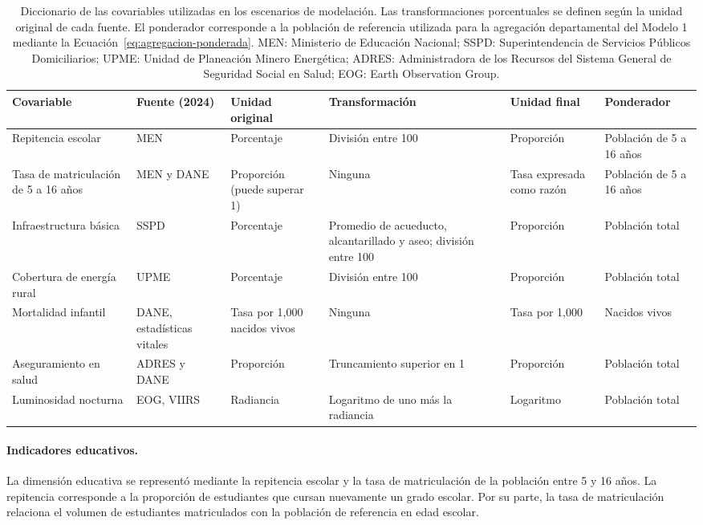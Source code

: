 \begin{table}[!htbp]
\centering
\footnotesize
\caption{Diccionario de las covariables utilizadas en los escenarios de modelación. Las transformaciones porcentuales se definen según la unidad original de cada fuente. El ponderador corresponde a la población de referencia utilizada para la agregación departamental del Modelo 1 mediante la Ecuación~\ref{eq:agregacion-ponderada}. MEN: Ministerio de Educación Nacional; SSPD: Superintendencia de Servicios Públicos Domiciliarios; UPME: Unidad de Planeación Minero Energética; ADRES: Administradora de los Recursos del Sistema General de Seguridad Social en Salud; EOG: Earth Observation Group.}
\label{tab:diccionario}
\renewcommand{\arraystretch}{1.2}
\begin{tabular}{p{2.3cm} p{1.9cm} p{1.8cm} p{2.3cm} p{1.6cm} p{1.9cm}}
\hline
Covariable & Fuente (2024) & Unidad original & Transformación & Unidad final & Ponderador \\
\hline
Repitencia escolar & MEN & Porcentaje & División entre 100 & Proporción & Población de 5 a 16 años \\
Tasa de matriculación de 5 a 16 años & MEN y DANE & Proporción (puede superar 1) & Ninguna & Tasa expresada como razón & Población de 5 a 16 años \\
Infraestructura básica & SSPD & Porcentaje & Promedio de acueducto, alcantarillado y aseo; división entre 100 & Proporción & Población total \\
Cobertura de energía rural & UPME & Porcentaje & División entre 100 & Proporción & Población total \\
Mortalidad infantil & DANE, estadísticas vitales & Tasa por 1{,}000 nacidos vivos & Ninguna & Tasa por 1{,}000 & Nacidos vivos \\
Aseguramiento en salud & ADRES y DANE & Proporción & Truncamiento superior en 1 & Proporción & Población total \\
Luminosidad nocturna & EOG, VIIRS & Radiancia & Logaritmo de uno más la radiancia & Logaritmo & Población total \\
\hline
\end{tabular}
\end{table}

\paragraph{Indicadores educativos.}

La dimensión educativa se representó mediante la repitencia escolar y la tasa de matriculación de la población entre 5 y 16 años. La repitencia corresponde a la proporción de estudiantes que cursan nuevamente un grado escolar. Por su parte, la tasa de matriculación relaciona el volumen de estudiantes matriculados con la población de referencia en edad escolar.

